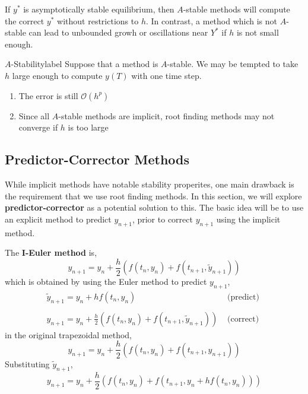 \begin{rmk}
	If $y^*$ is asymptotically stable equilibrium, then $A$-stable methods will compute the correct $y^*$ without restrictions to $h$. In contrast, a method which is not $A$-stable can lead to unbounded growh or oscillations near $Y^*$ if $h$ is not small enough. 
\end{rmk}

\begin{ex}{$A$-Stability}{label}
	Suppose that a method is $A$-stable. We may be tempted to take $h$ large enough to compute $y(T)$ with one time step.
	\begin{enumerate}
		\item The error is still $\mathcal{O}(h^p)$
		\item Since all $A$-stable methods are implicit, root finding methods may not converge if $h$ is too large
	\end{enumerate}
\end{ex}

\subsection{Predictor-Corrector Methods}
While implicit methods have notable stability properites, one main drawback is the requirement that we use root finding methods. In this section, we will explore \textbf{predictor-corrector} as a potential solution to this. The basic idea will be to use an explicit method to predict $y_{n+1}$, prior to correct $y_{n+1}$ using the implicit method.

\begin{defn}
	The \textbf{I-Euler method} is,
	\[y_{n+1}=y_n+\frac{h}{2}\left(f\left(t_n, y_n\right)+f\left(t_{n+1}, \tilde{y}_{n+1}\right)\right)\]
	which is obtained by using the Euler method to predict $y_{n+1}$,
	\[\begin{array}{ll}
	\tilde{y}_{n+1}=y_n+h f\left(t_n, y_n\right) & \text { (predict) } \\
	&\\
	y_{n+1}=y_n+\frac{h}{2}\left(f\left(t_n, y_n\right)+f\left(t_{n+1}, \tilde{y}_{n+1}\right)\right) & \text { (correct) }
	\end{array}\]
	in the original trapezoidal method,
	\[y_{n+1}=y_n+\frac{h}{2}\left(f\left(t_n, y_n\right)+f\left(t_{n+1}, y_{n+1}\right)\right)\]
	Substituting $\tilde{y}_{n+1}$,
	\[y_{n+1}=y_n+\frac{h}{2}\left(f\left(t_n, y_n\right)+f\left(t_{n+1}, y_n+h f\left(t_n, y_n\right)\right)\right)\] 
\end{defn}

